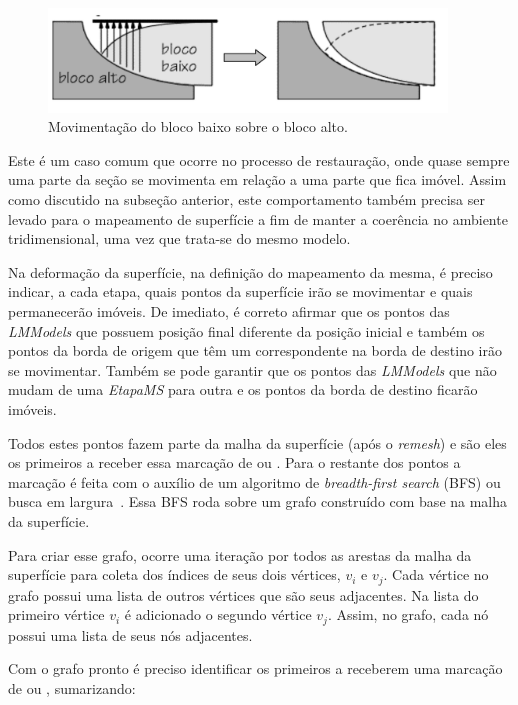 \begin{figure} [H]
  \begin{center}
    \includegraphics[width=300pt]{images/fig-hang-foot-wall}
    \caption{Movimentação do bloco baixo sobre o bloco alto.~\cite{Santi}}\label{fig-hang-foot-wall}
  \end{center}
\end{figure}

Este é um caso comum que ocorre no processo de restauração, onde quase sempre uma parte da seção se movimenta em relação a uma parte que fica imóvel. Assim como discutido na subseção anterior, este comportamento também precisa ser levado para o mapeamento de superfície a fim de manter a coerência no ambiente tridimensional, uma vez que trata-se do mesmo modelo.

Na deformação da superfície, na definição do mapeamento da mesma, é preciso indicar, a cada etapa, quais pontos da superfície irão se movimentar e quais permanecerão imóveis. De imediato, é correto afirmar que os pontos das \textit{LMModels} que possuem posição final diferente da posição inicial e também os pontos da borda de origem que têm um correspondente na borda de destino irão se movimentar. Também se pode garantir que os pontos das \textit{LMModels} que não mudam de uma \textit{EtapaMS} para outra e os pontos da borda de destino ficarão imóveis.

Todos estes pontos fazem parte da malha da superfície (após o \textit{remesh}) e são eles os primeiros a receber essa marcação de  ou . Para o restante dos pontos a marcação é feita com o auxílio de um algoritmo de \textit{breadth-first search} (BFS) ou busca em largura~\cite{Nilsson}. Essa BFS roda sobre um grafo construído com base na malha da superfície. 

Para criar esse grafo, ocorre uma iteração por todos as arestas da malha da superfície para coleta dos índices de seus dois vértices, $v_i$ e $v_j$. Cada vértice no grafo possui uma lista de outros vértices que são seus adjacentes. Na lista do primeiro vértice $v_i$ é adicionado o segundo vértice $v_j$. Assim, no grafo, cada nó possui uma lista de seus nós adjacentes.

Com o grafo pronto é preciso identificar os primeiros a receberem uma marcação de  ou , sumarizando:

